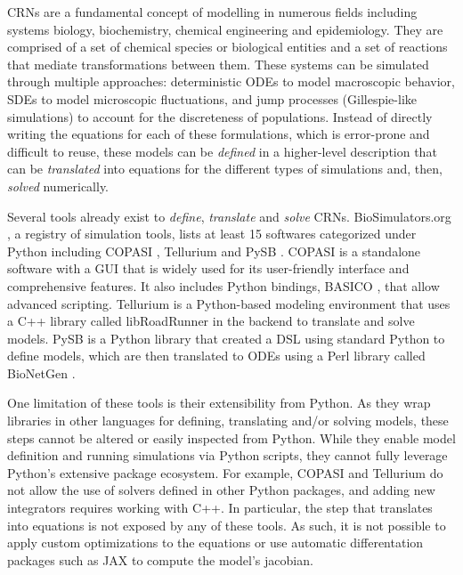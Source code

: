 \documentclass[namedate,numsec,webpdf,modern,large]{oup-authoring-template}
\theoremstyle{thmstyleone}%
\theoremstyle{thmstyletwo}%
\theoremstyle{thmstylethree}%
\begin{document}
\Acp{CRN} are a fundamental concept of modelling in numerous fields
including systems biology, biochemistry, chemical engineering and epidemiology.
They are comprised of a set of chemical species or biological entities
and a set of reactions that mediate transformations between them.
These systems can be simulated through multiple approaches:
deterministic \acp{ODE} to model macroscopic behavior,
\acp{SDE} to model microscopic fluctuations,
and jump processes (Gillespie-like simulations) to account for the discreteness of populations.
Instead of directly writing the equations for each of these formulations,
which is error-prone and difficult to reuse,
these models can be \emph{defined} in a higher-level description
that can be \emph{translated} into equations for the different types of simulations
and, then, \emph{solved} numerically.

Several tools already exist to \emph{define}, \emph{translate} and \emph{solve} \acp{CRN}.
BioSimulators.org \citep{shaikhBioSimulatorsCentralRegistry2022},
a registry of simulation tools,
lists at least 15 softwares categorized under Python including
COPASI \citep{hoopsCOPASICOmplexPAthway2006},
Tellurium \citep{choiTelluriumExtensiblePythonbased2018} and
PySB \citep{lopezProgrammingBiologicalModels2013}.
COPASI is a standalone software with a \ac{GUI}
that is widely used for its user-friendly interface and comprehensive features.
It also includes Python bindings, BASICO \citep{bergmannBASICOSimplifiedPython2023b}, that allow advanced scripting.
Tellurium is a Python-based modeling environment
that uses a C++ library called libRoadRunner \citep{welshLibRoadRunnerHighPerformance2023} in the backend to translate and solve models.
PySB is a Python library that created a \ac{DSL} using standard Python to define models,
which are then translated to \acp{ODE} using a Perl library called BioNetGen \citep{harrisBioNetGenAdvancesRulebased2016}.

One limitation of these tools is their extensibility from Python.
As they wrap libraries in other languages for defining, translating and/or solving models,
these steps cannot be altered or easily inspected from Python.
While they enable model definition and running simulations via Python scripts,
they cannot fully leverage Python's extensive package ecosystem.
For example,
COPASI and Tellurium do not allow the use of solvers defined in other Python packages,
and adding new integrators requires working with C++.
In particular, the step that translates into equations is not exposed by any of these tools.
As such, it is not possible to apply custom optimizations to the equations
or use automatic differentation packages such as JAX \citep{jax2018github} to compute the model's jacobian.
\end{document}
